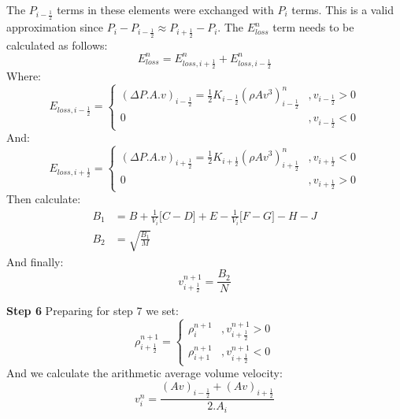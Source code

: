 \documentclass[11pt,letterpaper,titlepage]{article}
\newcommand{\half}{\frac{1}{2}}
\begin{document}
\newline
The $P_{i-\half}$ terms in these elements were exchanged with $P_i$ terms. This is a valid approximation since $P_i-P_{i-\half}\approx P_{i+\half}-P_i$. The $E_{loss}^n$ term needs to be calculated as follows:
\begin{equation*}
E_{loss}^n=E_{loss,i+\half}^n+E_{loss,i-\half}^n
\end{equation*}
Where:
\begin{equation*}
E_{loss,i-\half}=
\begin{cases}
(\Delta P.A.v)_{i-\half} = \half  K_{i-\half} (\rho A v^3)_{i-\half}^n     &,v_{i-\half}>0 \\
0    &,v_{i-\half}<0
\end{cases}
\end{equation*}
\newline
\noindent And:
\begin{equation*}
E_{loss,i+\half}=
\begin{cases}
(\Delta P.A.v)_{i+\half} = \half  K_{i+\half} (\rho A v^3)_{i+\half}^n     &,v_{i+\half}<0 \\
0    &,v_{i+\half}>0
\end{cases}
\end{equation*}
\newline
Then calculate:
\begin{equation*}
\begin{aligned}
B_1&= B+\frac{1}{V_i}\biggr[ C - D \biggr]+E - \frac{1}{V_i}\biggr[   F - G   \biggr]- H-J \\
B_2&=\sqrt{\frac{B_1}{M}}
\end{aligned}
\end{equation*}
And finally:
\begin{equation*}
v_{i+\half}^{n+1}=\frac{B_2}{N}
\end{equation*}



\vspace{0.5cm}\noindent
\textbf{Step 6}\newline
Preparing for step 7 we set:
\begin{equation*}
\rho_{i+\half}^{n+1}=
\begin{cases}
\rho_{i}^{n+1}     &,v_{i+\half}^{n+1}>0 \\
\rho_{i+1}^{n+1}    &,v_{i+\half}^{n+1}<0
\end{cases}
\end{equation*}
And we calculate the arithmetic average volume velocity:
\begin{equation*}
v_i^n = \frac{(Av)_{i-\half}+(Av)_{i+\half}}{2.A_i}
\end{equation*}
\end{document}
